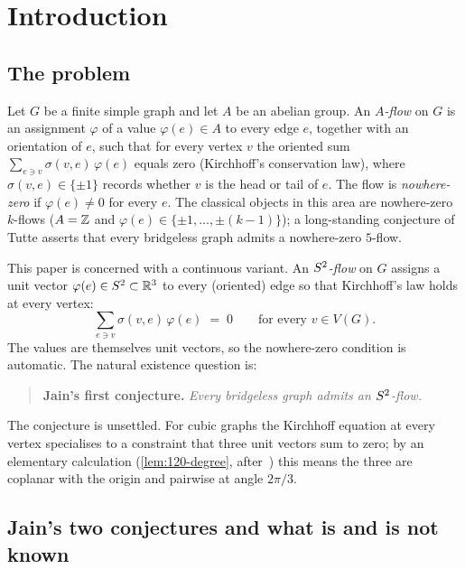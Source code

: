 \section{Introduction}
\label{sec:intro}

\subsection{The problem}
\label{sec:intro-problem}

Let $G$ be a finite simple graph and let $A$ be an abelian group. An
\emph{$A$-flow} on $G$ is an assignment $\varphi$ of a value
$\varphi(e) \in A$ to every edge $e$, together with an orientation of
$e$, such that for every vertex $v$ the oriented sum
$\sum_{e \ni v}\sigma(v,e)\,\varphi(e)$ equals zero (Kirchhoff's
conservation law), where $\sigma(v,e) \in \{\pm 1\}$ records whether
$v$ is the head or tail of $e$. The flow is \emph{nowhere-zero} if
$\varphi(e) \ne 0$ for every $e$. The classical objects in this area
are nowhere-zero $k$-flows ($A = \mathbb{Z}$ and $\varphi(e) \in \{\pm 1, \dots,
\pm(k-1)\}$); a long-standing conjecture of Tutte asserts that every
bridgeless graph admits a nowhere-zero $5$-flow.

This paper is concerned with a continuous variant. An
\emph{$S^{2}$-flow} on $G$ assigns a unit vector $\varphi(e) \in S^{2}
\subset \mathbb{R}^{3}$ to every (oriented) edge so that Kirchhoff's law holds
at every vertex:
\begin{equation}
\label{eq:kirchhoff}
  \sum_{e \ni v} \sigma(v,e)\,\varphi(e) \;=\; 0 \qquad \text{for every } v \in V(G).
\end{equation}
The values are themselves unit vectors, so the nowhere-zero condition
is automatic. The natural existence question is:

\begin{quote}
  \textbf{Jain's first conjecture.} \emph{Every bridgeless graph
  admits an $S^{2}$-flow.}
\end{quote}

The conjecture is unsettled. For cubic graphs the Kirchhoff equation
at every vertex specialises to a constraint that three unit vectors
sum to zero; by an elementary calculation
(\cref{lem:120-degree}, after~\cite{HMM26}) this means the three are
coplanar with the origin and pairwise at angle $2\pi/3$.

\subsection{Jain's two conjectures and what is and is not known}
\label{sec:intro-disambiguation}

